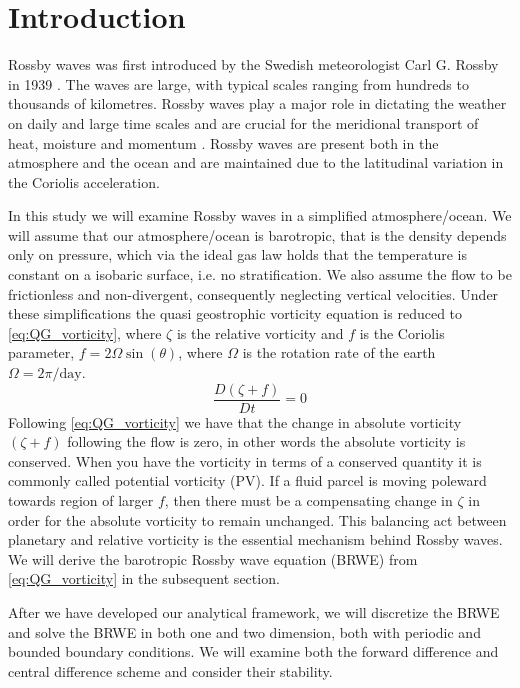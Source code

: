 \section{Introduction}
Rossby waves was first introduced by the Swedish meteorologist
Carl G. Rossby in 1939 \parencite{Rossby1939}. The waves are large, with typical scales ranging from 
hundreds to thousands of kilometres. Rossby waves play a major role in dictating
the weather on daily and large time scales and are crucial for the meridional
transport of heat, moisture and momentum \parencite{midSynDyn}. 
Rossby waves are present both in the atmosphere and the ocean and are maintained
due to the latitudinal variation in the Coriolis acceleration.

In this study we will examine Rossby waves in a simplified 
atmosphere/ocean. We will assume that our atmosphere/ocean is barotropic, that
is the density depends only on pressure, which via the ideal gas law holds that
the temperature is constant on a isobaric surface, i.e. no stratification. We also assume the flow to be frictionless and
non-divergent, consequently neglecting vertical velocities. Under these
simplifications the quasi geostrophic vorticity equation is reduced to
\cref{eq:QG_vorticity}, where $\zeta$ is the relative vorticity and $f$ is the
Coriolis parameter, $f=2\Omega \sin(\theta)$, where $\Omega$ is
the rotation rate of the earth $\Omega = 2\pi/ \mathrm{day}$.
\begin{equation}\label{eq:QG_vorticity}
    \frac{D(\zeta + f)}{Dt} = 0
\end{equation}
Following \cref{eq:QG_vorticity} we have that the
change in absolute vorticity $(\zeta + f)$ following the flow is zero, in other
words the absolute vorticity is conserved. When you have the vorticity in terms
of a conserved quantity it is commonly called potential vorticity (PV). If a fluid parcel is moving
poleward towards region of larger $f$, then there must be a compensating change
in $\zeta$ in order for the absolute vorticity to remain unchanged. This
balancing act between planetary and relative vorticity is the essential
mechanism behind
Rossby waves. We will derive the barotropic Rossby
wave equation (BRWE) from \cref{eq:QG_vorticity} in the subsequent section.

After we have developed our analytical framework, we will discretize the BRWE
and solve the BRWE in both one and two dimension, both with periodic and
bounded boundary conditions. We will examine both the forward
difference and central difference scheme and consider their stability. 